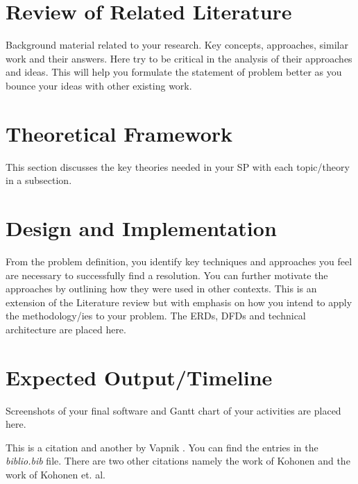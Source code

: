 \documentclass[11pt,a4paper,titlepage]{article}
\let\stdsection\section
\renewcommand\section{\newpage\stdsection}
\begin{document}
\section{Review of Related Literature}

Background material related to your research. Key concepts, approaches, similar work and their answers. Here try to be critical in the analysis of their approaches and ideas. This will help you formulate the statement of problem better as you bounce your ideas with other existing work.

\section{Theoretical Framework}

This section discusses the key theories needed in your SP with each topic/theory in a subsection.

\section{Design and Implementation}
From the problem definition, you identify key techniques and approaches you feel are necessary to successfully find a resolution. You can further motivate the approaches by outlining how they were used in other contexts. This is an extension of the Literature review but with emphasis on how you intend to apply the methodology/ies to your problem. The ERDs, DFDs and technical architecture are placed here.

\section{Expected Output/Timeline}

Screenshots of your final software and Gantt chart of your activities are placed here.


This is a citation \cite{Pavlovic} and another by Vapnik \cite{Vapnik}. You can find the entries in the {\it biblio.bib} file. There are two other citations namely the work of Kohonen \cite{Kohonen2} and the work of Kohonen et. al. \cite{Kohonen1}




\end{document}
